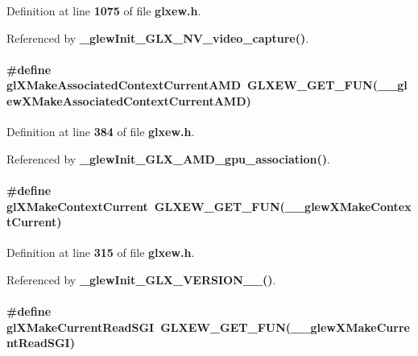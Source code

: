 Definition at line {\bf 1075} of file {\bf glxew.\+h}.



Referenced by {\bf \+\_\+glew\+Init\+\_\+\+G\+L\+X\+\_\+\+N\+V\+\_\+video\+\_\+capture()}.

\paragraph[{gl\+X\+Make\+Associated\+Context\+Current\+A\+MD}]{\setlength{\rightskip}{0pt plus 5cm}\#define gl\+X\+Make\+Associated\+Context\+Current\+A\+MD~{\bf G\+L\+X\+E\+W\+\_\+\+G\+E\+T\+\_\+\+F\+UN}({\bf \+\_\+\+\_\+glew\+X\+Make\+Associated\+Context\+Current\+A\+MD})}\label{glxew_8h_a3069e9d0d7e3769befbc6b33d76494f6}


Definition at line {\bf 384} of file {\bf glxew.\+h}.



Referenced by {\bf \+\_\+glew\+Init\+\_\+\+G\+L\+X\+\_\+\+A\+M\+D\+\_\+gpu\+\_\+association()}.

\paragraph[{gl\+X\+Make\+Context\+Current}]{\setlength{\rightskip}{0pt plus 5cm}\#define gl\+X\+Make\+Context\+Current~{\bf G\+L\+X\+E\+W\+\_\+\+G\+E\+T\+\_\+\+F\+UN}({\bf \+\_\+\+\_\+glew\+X\+Make\+Context\+Current})}\label{glxew_8h_abbe37dd553fdef5210871c5d25b3233f}


Definition at line {\bf 315} of file {\bf glxew.\+h}.



Referenced by {\bf \+\_\+glew\+Init\+\_\+\+G\+L\+X\+\_\+\+V\+E\+R\+S\+I\+O\+N\+\_\+\_()}.

\paragraph[{gl\+X\+Make\+Current\+Read\+S\+GI}]{\setlength{\rightskip}{0pt plus 5cm}\#define gl\+X\+Make\+Current\+Read\+S\+GI~{\bf G\+L\+X\+E\+W\+\_\+\+G\+E\+T\+\_\+\+F\+UN}({\bf \+\_\+\+\_\+glew\+X\+Make\+Current\+Read\+S\+GI})}\label{glxew_8h_a5a102d92849aa014063d87e56891a65a}



